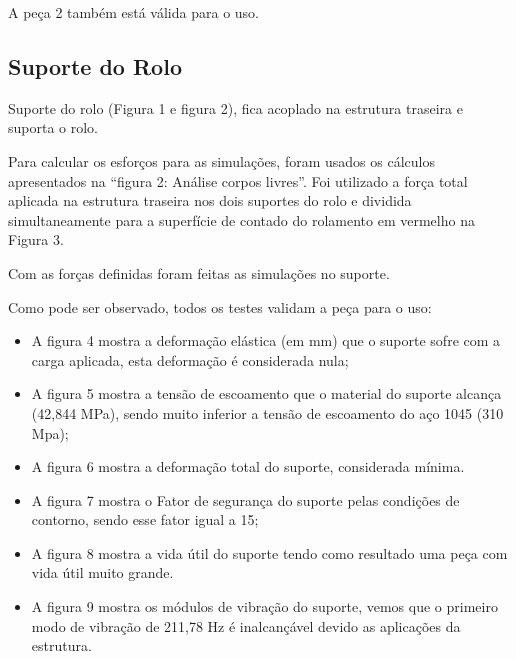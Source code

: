 A peça 2 também está válida para o uso.

\subsection{Suporte do Rolo}

Suporte do rolo (Figura 1 e figura 2), fica acoplado na estrutura traseira e suporta o rolo.
 

 
 
Para calcular os esforços para as simulações, foram usados os cálculos apresentados na “figura 2: Análise corpos livres”.  Foi utilizado a força total aplicada na estrutura traseira nos dois suportes do rolo e dividida simultaneamente para a superfície de contado do rolamento em vermelho na Figura 3.

  
Com as forças definidas foram feitas as simulações no suporte.

 

 


 
Como pode ser observado, todos os testes validam a peça para o uso:
\begin{itemize}
    \item A figura 4 mostra a deformação elástica (em mm) que o suporte sofre com a carga aplicada, esta deformação é considerada nula;
    \item A figura 5 mostra a tensão de escoamento que o material do suporte alcança (42,844 MPa), sendo muito inferior a tensão de escoamento do aço 1045 (310 Mpa);
    \item A figura 6 mostra a deformação total do suporte, considerada mínima.
    \item A figura 7 mostra o Fator de segurança do suporte pelas condições de contorno, sendo esse fator igual a 15;
    \item A figura 8 mostra a vida útil do suporte tendo como resultado uma peça com vida útil muito grande.
    \item A figura 9 mostra os módulos de vibração do suporte, vemos que o primeiro modo de vibração de 211,78 Hz é inalcançável devido as aplicações da estrutura.
\end{itemize}

